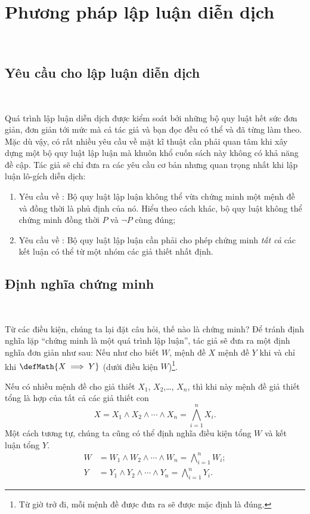 \section{Phương pháp lập luận diễn dịch}

\ %

\subsection{Yêu cầu cho lập luận diễn dịch}

\ %

Quá trình lập luận diễn dịch được kiểm soát bởi những bộ quy luật hết sức đơn giản, đơn giản tới mức mà cả tác giả và bạn đọc đều có thể và đã từng làm theo. Mặc dù vậy, có rất nhiều yêu cầu về mặt kĩ thuật cần phải quan tâm khi xây dựng một bộ quy luật lập luận mà khuôn khổ cuốn sách này không có khả năng đề cập. Tác giả sẽ chỉ đưa ra các yêu cầu cơ bản nhưng quan trọng nhất khi lập luận lô-gích diễn dịch:
\begin{enumerate}
    \item Yêu cầu về : Bộ quy luật lập luận không thể vừa chứng minh một mệnh đề và đồng thời là phủ định của nó. Hiểu theo cách khác, bộ quy luật không thể chứng minh đồng thời $P$ và $\neg P$ cùng đúng;
    \item Yêu cầu về : Bộ quy luật lập luận cần phải cho phép chứng minh \emph{tất cả} các kết luận có thể từ một nhóm các giả thiết nhất định.
\end{enumerate}

\subsection{Định nghĩa chứng minh}

\ %

Từ các điều kiện, chúng ta lại đặt câu hỏi, thế nào là chứng minh? Để tránh định nghĩa lặp ``chứng minh là một quá trình lập luận'', tác giả sẽ đưa ra một định nghĩa đơn giản như sau: Nếu như cho biết $W$, mệnh đề $X$  mệnh đề $Y$ khi và chỉ khi $\defMath{X \implies Y}$ (dưới điều kiện $W$)\footnote{Từ giờ trở đi, mỗi mệnh đề được đưa ra sẽ được mặc định là đúng.}.

Nếu có nhiều mệnh đề cho giả thiết $X_1$, $X_2$,\dots, $X_n$, thì khi này mệnh đề giả thiết tổng là hợp của tất cả các giả thiết con
$$X = X_1 \land X_2 \land \cdots \land X_n = \bigwedge_{i=1}^{n} X_i.$$
Một cách tương tự, chúng ta cũng có thể định nghĩa điều kiện tổng $W$ và kết luận tổng $Y$.
\begin{align*}
    W &= W_1 \land W_2 \land \cdots \land W_n = \bigwedge_{i=1}^{n} W_i; \\
    Y &= Y_1 \land Y_2 \land \cdots \land Y_n = \bigwedge_{i=1}^{n} Y_i.
\end{align*}


